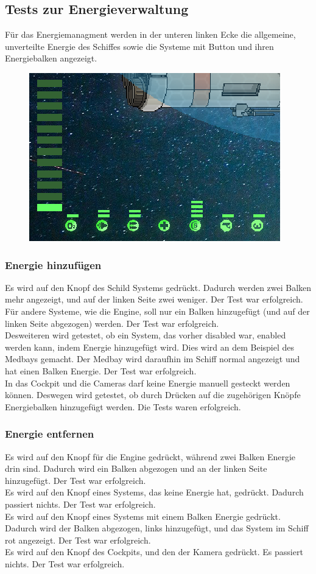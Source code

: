 \documentclass[fontsize=12pt,paper=a4,twoside]{scrartcl}
\begin{document}
\subsection{Tests zur Energieverwaltung}
Für das Energiemanagment werden in der unteren linken Ecke die allgemeine, unverteilte Energie des Schiffes sowie die Systeme mit Button und ihren Energiebalken angezeigt. \\
\begin{figure}[h!]
\centering
\includegraphics[width=0.5\linewidth]{images/energy1.png}
\end{figure}
\subsubsection{Energie hinzufügen}
Es wird auf den Knopf des Schild Systems gedrückt. Dadurch werden zwei Balken mehr angezeigt, und auf der linken Seite zwei weniger. Der Test war erfolgreich. \\
Für andere Systeme, wie die Engine, soll nur ein Balken hinzugefügt (und auf der linken Seite abgezogen) werden. Der Test war erfolgreich. \\
Desweiteren wird getestet, ob ein System, das vorher disabled war, enabled werden kann, indem Energie hinzugefügt wird. Dies wird an dem Beispiel des Medbays gemacht. Der Medbay wird daraufhin im Schiff normal angezeigt und hat einen Balken Energie. Der Test war erfolgreich. \\
In das Cockpit und die Cameras darf keine Energie manuell gesteckt werden können. Deswegen wird getestet, ob durch Drücken auf die zugehörigen Knöpfe Energiebalken hinzugefügt werden. Die Tests waren erfolgreich. \\
\subsubsection{Energie entfernen}
Es wird auf den Knopf für die Engine gedrückt, während zwei Balken Energie drin sind. Dadurch wird ein Balken abgezogen und an der linken Seite hinzugefügt. Der Test war erfolgreich. \\
Es wird auf den Knopf eines Systems, das keine Energie hat, gedrückt. Dadurch passiert nichts. Der Test war erfolgreich. \\
Es wird auf den Knopf eines Systems mit einem Balken Energie gedrückt. Dadurch wird der Balken abgezogen, links hinzugefügt, und das System im Schiff rot angezeigt. Der Test war erfolgreich. \\
Es wird auf den Knopf des Cockpits, und  den der Kamera gedrückt. Es passiert nichts. Der Test war erfolgreich.  \\
\end{document}
